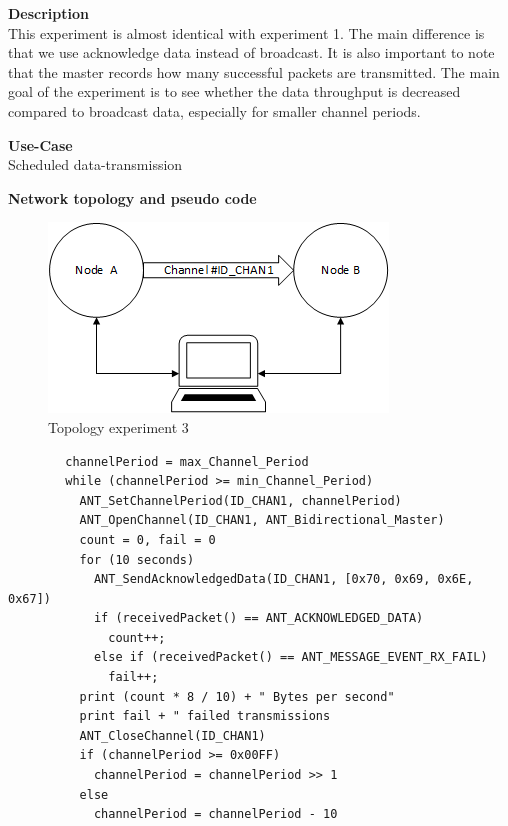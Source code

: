 \begin{description} 
	\item{\textbf{Description}} \hfill \\ This experiment is almost identical with experiment 1. The main difference is that we use acknowledge data instead of broadcast. It is also important to note that the master records how many successful packets are transmitted. The main goal of the experiment is to see whether the data throughput is decreased compared to broadcast data, especially for smaller channel periods.
	\item{\textbf{Use-Case}} \hfill \\ Scheduled data-transmission
	\item{\textbf{Network topology and pseudo code}} \hfill \\
	\begin{figure}[H]
		\centering
		\includegraphics[scale=1]{content/images/exp_topo.png}
		\caption{Topology experiment 3}
	\end{figure}
	\begin{code}[H]
		\begin{verbatim}
		channelPeriod = max_Channel_Period
		while (channelPeriod >= min_Channel_Period) 
		  ANT_SetChannelPeriod(ID_CHAN1, channelPeriod)
		  ANT_OpenChannel(ID_CHAN1, ANT_Bidirectional_Master)
		  count = 0, fail = 0
		  for (10 seconds) 
		    ANT_SendAcknowledgedData(ID_CHAN1, [0x70, 0x69, 0x6E, 0x67])		    
		    if (receivedPacket() == ANT_ACKNOWLEDGED_DATA)		        
		      count++;			  
		    else if (receivedPacket() == ANT_MESSAGE_EVENT_RX_FAIL)
		      fail++;		    
		  print (count * 8 / 10) + " Bytes per second"	  
		  print fail + " failed transmissions
		  ANT_CloseChannel(ID_CHAN1)
		  if (channelPeriod >= 0x00FF)
		    channelPeriod = channelPeriod >> 1
		  else
		    channelPeriod = channelPeriod - 10
		\end{verbatim}
		\caption{Acknowledge data transfer (Master)}\label{lst:mExp3}
	\end{code}
	

\end{description}
